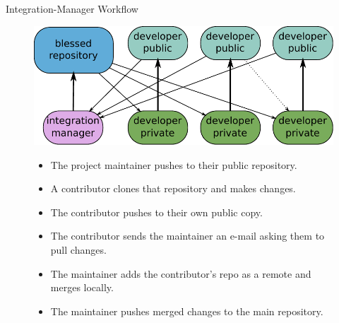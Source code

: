 \begin{frame}{Integration-Manager Workflow}
\begin{figure} 
\centering
\includegraphics[scale=0.6]{images/integration-manager-workflow.pdf}
\begin{itemize}
\pause \item The project maintainer pushes to their public repository.
\pause \item A contributor clones that repository and makes changes.
\pause \item The contributor pushes to their own public copy.
\pause \item The contributor sends the maintainer an e-mail asking them to pull changes.
\pause \item The maintainer adds the contributor’s repo as a remote and merges locally.
\pause \item The maintainer pushes merged changes to the main repository.
\end{itemize}
\end{figure}
\end{frame}

